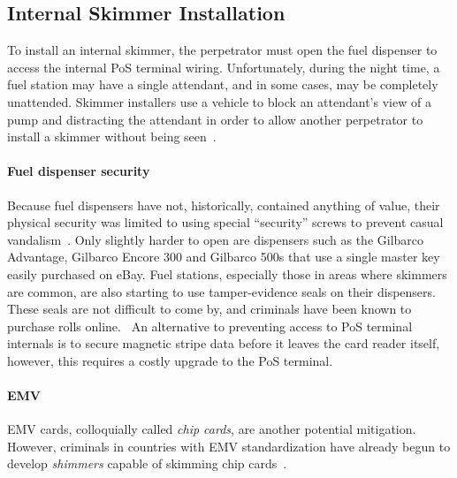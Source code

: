 


%

\subsection{Internal Skimmer Installation}
\label{sec:bkgd-install}

To install an internal skimmer, the perpetrator must open the fuel dispenser to access the internal PoS terminal wiring.
%
Unfortunately, during the night time, a fuel station may have a single attendant, and in some cases, may be completely
unattended.
%
Skimmer installers use a vehicle to block an attendant's view of a pump and distracting the attendant in order
to allow another perpetrator to install a skimmer without being seen~\cite{skimmerinstall1,skimmerinstall2}.

\paragraph{Fuel dispenser security} Because fuel dispensers have not, historically, contained anything of value, their physical
security was limited to using special ``security'' screws to prevent casual vandalism~\cite{ny-fuel-paymentdoor-access}.
%
Only slightly harder to open are dispensers such as the Gilbarco Advantage, Gilbarco Encore 300 and Gilbarco 500s that
use a single master key easily purchased on eBay.
%
 Fuel stations, especially those in areas where skimmers are common, are also starting to use tamper-evidence seals on
their dispensers.
%
These seals are not difficult to come by, and criminals have been known to purchase rolls online.~\cite{sealsForSale}
%
An alternative to preventing access to PoS terminal internals is to secure magnetic stripe data before it leaves the
card reader itself, however, this requires a costly upgrade to the PoS terminal.

\paragraph{EMV} EMV cards, colloquially called \emph{chip cards}, are another potential mitigation.
%
However, criminals in countries with EMV standardization have already begun to develop \emph{shimmers} capable
of skimming chip cards~\cite{krebshimmer}.

